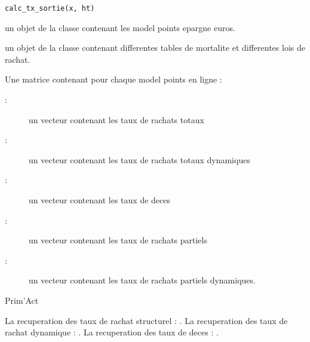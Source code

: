 \documentclass[a4paper]{book}
\begin{document}
%
\begin{Usage}
\begin{verbatim}
calc_tx_sortie(x, ht)
\end{verbatim}
\end{Usage}
%
\begin{Arguments}
\begin{ldescription}
\item[\code{x}] un objet de la classe  contenant les model points epargne euros.

\item[\code{ht}] un objet de la classe  contenant differentes tables de mortalite et differentes
lois de rachat.
\end{ldescription}
\end{Arguments}
%
\begin{Value}
Une matrice contenant pour chaque model points en ligne :
\begin{description}

\item[ : ] un vecteur contenant les taux de rachats totaux
\item[ : ] un vecteur contenant les taux de rachats totaux dynamiques
\item[ : ] un vecteur contenant les taux de deces
\item[ : ] un vecteur contenant les taux de rachats partiels
\item[ : ] un vecteur contenant les taux de rachats partiels dynamiques.

\end{description}

\end{Value}
%
\begin{Author}\relax
Prim'Act
\end{Author}
%
\begin{SeeAlso}\relax
La recuperation des taux de rachat structurel : .
La recuperation des taux de rachat dynamique : .
La recuperation des taux de deces : .
\end{SeeAlso}
\end{document}
